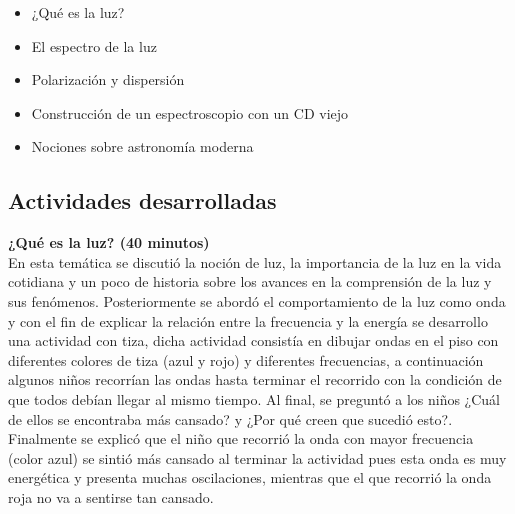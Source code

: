 \documentclass[a4paper,10pt]{article}
\begin{document}
\begin{itemize}
    \item ¿Qué es la luz?
    \item El espectro de la luz
    \item Polarización y dispersión
    \item Construcción de un espectroscopio con un CD viejo
    \item Nociones sobre astronomía moderna
\end{itemize}
\vspace{3mm}
\subsection{Actividades desarrolladas}
\noindent \textbf{¿Qué es la luz? (40 minutos)}\\

\noindent En esta temática se discutió la noción de luz, la importancia de la luz en la vida cotidiana y un poco de historia sobre los avances en la comprensión de la luz y sus fenómenos. Posteriormente se abordó el comportamiento de la luz como onda y con el fin de explicar la relación entre la frecuencia y la energía se desarrollo una actividad con tiza, dicha actividad consistía en dibujar ondas en el piso con diferentes colores de tiza (azul y rojo) y diferentes frecuencias, a continuación algunos niños recorrían las ondas hasta terminar el recorrido con la condición de que todos debían llegar al mismo tiempo. Al final, se preguntó a los niños ¿Cuál de ellos se encontraba más cansado? y ¿Por qué creen que sucedió esto?. Finalmente se explicó que el niño que recorrió la onda con mayor frecuencia (color azul) se sintió más cansado al terminar la actividad pues esta onda es muy energética y presenta muchas oscilaciones, mientras que el que recorrió la onda roja no va a sentirse tan cansado.
\end{document}
